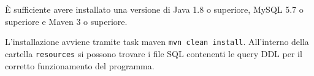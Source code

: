 È sufficiente avere installato una versione di Java 1.8 o superiore, MySQL 5.7 o superiore e Maven 3 o superiore.

L'installazione avviene tramite task maven \texttt{mvn clean install}.
All'interno della cartella \texttt{resources} si possono trovare i file SQL contenenti le query DDL per il corretto funzionamento del programma.
